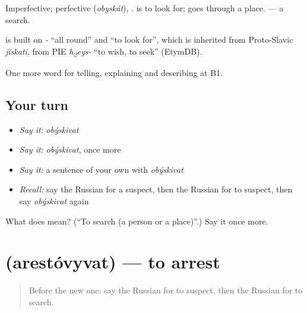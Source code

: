 Imperfective; perfective \emph{} (\emph{obyskát}), \emph{}. \emph{} is to look for; \emph{} goes through a place. \emph{} — a search.

\begin{cousinweb}
\emph{} is built on \emph{-} \textquotedblleft{}all round\textquotedblright{} and \emph{} \textquotedblleft{}to look for\textquotedblright{}, which is inherited from Proto-Slavic \emph{jĭskati}, from PIE \emph{h\textsubscript{2}eys-} \textquotedblleft{}to wish, to seek\textquotedblright{} (EtymDB).
\end{cousinweb}

\begin{grammarlens}[title={What you've built}]
One more word for telling, explaining and describing at B1.
\end{grammarlens}

\subsection*{Your turn}
\begin{itemize}
\raggedright
  \item \emph{Say it:} \emph{obýskivat}
  \item \emph{Say it:} \emph{obýskivat}, once more
  \item \emph{Say it:} a sentence of your own with \emph{obýskivat}
  \item \emph{Recall:} say the Russian for a suspect, then the Russian for to suspect, then say \emph{obýskivat} again
\end{itemize}

\begin{tcolorbox}[breakable,colback=teal!4,colframe=teal!35!black,title={Before you move on}]
What does  mean? (\textquotedblleft{}To search (a person or a place)\textquotedblright{}.) Say it once more.
\end{tcolorbox}
\section[\texorpdfstring{\ru{арестовывать} (arestóvyvat)}{арестовывать (arestóvyvat)}]{ (arestóvyvat) — to arrest}

\label{lesson:RU-C292-arestovyvat}



\begin{quote}
Before the new one: say the Russian for to suspect, then the Russian for to search.
\end{quote}

